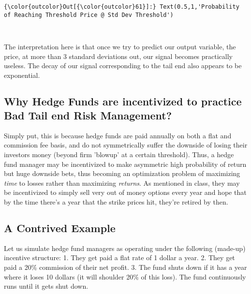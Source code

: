 \documentclass[11pt]{article}
\begin{document}
\begin{Verbatim}[commandchars=\\\{\}]
{\color{outcolor}Out[{\color{outcolor}61}]:} Text(0.5,1,'Probability of Reaching Threshold Price @ Std Dev Threshold')
\end{Verbatim}
            
    \begin{center}
    \end{center}
    { \hspace*{\fill} \\}
    
    The interpretation here is that once we try to predict our output
variable, the price, at more than 3 standard deviations out, our signal
becomes practically useless. The decay of our signal corresponding to
the tail end also appears to be exponential.

    \subsection{Why Hedge Funds are incentivized to practice Bad Tail end
Risk
Management?}\label{why-hedge-funds-are-incentivized-to-practice-bad-tail-end-risk-management}

    Simply put, this is because hedge funds are paid annually on both a flat
and commission fee basis, and do not symmetrically suffer the downside
of losing their investors money (beyond firm 'blowup' at a certain
threshold). Thus, a hedge fund manager may be incentivized to make
asymmetric high probability of return but huge downside bets, thus
becoming an optimization problem of maximizing \emph{time} to losses
rather than maximizing \emph{returns}. As mentioned in class, they may
be incentivized to simply sell very out of money options every year and
hope that by the time there's a year that the strike prices hit, they're
retired by then.

    \subsection{A Contrived Example}\label{a-contrived-example}

    Let us simulate hedge fund managers as operating under the following
(made-up) incentive structure: 1. They get paid a flat rate of 1 dollar
a year. 2. They get paid a 20\% commission of their net profit. 3. The
fund shuts down if it has a year where it loses 10 dollars (it will
shoulder 20\% of this loss). The fund continuously runs until it gets
shut down.
\end{document}
